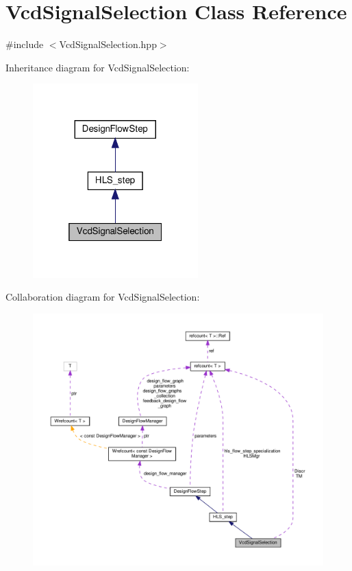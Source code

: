 \hypertarget{classVcdSignalSelection}{}\section{Vcd\+Signal\+Selection Class Reference}
\label{classVcdSignalSelection}


{\ttfamily \#include $<$Vcd\+Signal\+Selection.\+hpp$>$}



Inheritance diagram for Vcd\+Signal\+Selection\+:
\nopagebreak
\begin{figure}[H]
\begin{center}
\leavevmode
\includegraphics[width=181pt]{d0/de5/classVcdSignalSelection__inherit__graph}
\end{center}
\end{figure}


Collaboration diagram for Vcd\+Signal\+Selection\+:
\nopagebreak
\begin{figure}[H]
\begin{center}
\leavevmode
\includegraphics[width=350pt]{d6/d7b/classVcdSignalSelection__coll__graph}
\end{center}
\end{figure}
